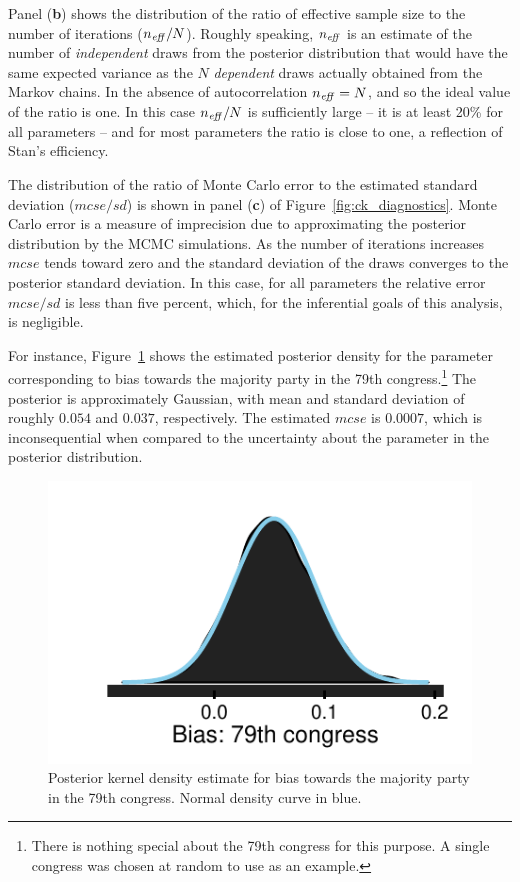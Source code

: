 Panel ({\bf b}) shows the distribution of the ratio of effective sample size to the number of 
iterations ($n_{\it eff}/N$). Roughly speaking, $n_{\it eff}$ is an estimate of the number of 
{\it independent} draws from the posterior distribution that would have the same expected 
variance as the $N$ {\it dependent} draws actually obtained from the 
Markov chains. In the absence of autocorrelation $n_{\it eff} = N$, and so the ideal value of the ratio is one. 
In this case $n_{\it eff}/N$ is sufficiently large -- it is at least 20\% for all parameters -- and 
for most parameters the ratio is close to one, a reflection of Stan's efficiency. 


The distribution of the ratio of Monte Carlo error to the estimated standard 
deviation ($mcse/sd$) is shown in panel ({\bf c}) of Figure~\ref{fig:ck_diagnostics}. 
Monte Carlo error is a measure of imprecision due to approximating 
the posterior distribution by the MCMC simulations. As the number of iterations increases 
$mcse$ tends toward zero and the standard deviation of the draws converges to the posterior 
standard deviation. In this case, for all parameters 
the relative error $mcse/sd$ is less than five percent, which, for the inferential goals of this 
analysis, is negligible. 

For instance, Figure~\ref{fig:ck_example_posterior} shows the estimated 
posterior density for the parameter corresponding to bias towards the majority party in the 79th 
congress.\footnote{There is nothing special about the 79th congress for this purpose. A single 
congress was chosen at random to use as an example.} The posterior is approximately Gaussian, 
with mean and standard deviation of roughly $0.054$ and $0.037$, respectively. The 
estimated $mcse$ is $0.0007$, which is inconsequential when compared to the uncertainty about 
the parameter in the posterior distribution.   


\begin{figure}[h]
\centering
	\includegraphics[scale=0.75]{sections/figs/example_posterior}
\caption{Posterior kernel density estimate for bias towards the majority party in the 79th congress. 
Normal density curve in blue.}
\label{fig:ck_example_posterior}
\end{figure}


